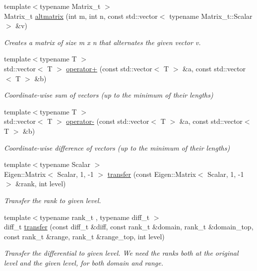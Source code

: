 \begin{DoxyCompactItemize}
{\footnotesize template$<$typename Matrix\+\_\+t $>$ }\\Matrix\+\_\+t \hyperlink{namespaceMackey_a26a529f63caac9c5b4dc809e0e5831be}{altmatrix} (int m, int n, const std\+::vector$<$ typename Matrix\+\_\+t\+::\+Scalar $>$ \&v)
\begin{DoxyCompactList}\small\item\em Creates a matrix of size m x n that alternates the given vector v. \end{DoxyCompactList}\item 
{\footnotesize template$<$typename T $>$ }\\std\+::vector$<$ T $>$ \hyperlink{namespaceMackey_adb4974b5ffe533abb955ccb6b9096155}{operator+} (const std\+::vector$<$ T $>$ \&a, const std\+::vector$<$ T $>$ \&b)
\begin{DoxyCompactList}\small\item\em Coordinate-\/wise sum of vectors (up to the minimum of their lengths) \end{DoxyCompactList}\item 
{\footnotesize template$<$typename T $>$ }\\std\+::vector$<$ T $>$ \hyperlink{namespaceMackey_ae86e49097ef9a09ebcd0173881e88786}{operator-\/} (const std\+::vector$<$ T $>$ \&a, const std\+::vector$<$ T $>$ \&b)
\begin{DoxyCompactList}\small\item\em Coordinate-\/wise difference of vectors (up to the minimum of their lengths) \end{DoxyCompactList}\item 
{\footnotesize template$<$typename Scalar $>$ }\\Eigen\+::\+Matrix$<$ Scalar, 1, -\/1 $>$ \hyperlink{namespaceMackey_a671613d53fc3b0c9c4b115bc8b2797e6}{transfer} (const Eigen\+::\+Matrix$<$ Scalar, 1, -\/1 $>$ \&rank, int level)
\begin{DoxyCompactList}\small\item\em Transfer the rank to given level. \end{DoxyCompactList}\item 
{\footnotesize template$<$typename rank\+\_\+t , typename diff\+\_\+t $>$ }\\diff\+\_\+t \hyperlink{namespaceMackey_ad7524839b58c80d4b2c54827e4833b12}{transfer} (const diff\+\_\+t \&diff, const rank\+\_\+t \&domain, rank\+\_\+t \&domain\+\_\+top, const rank\+\_\+t \&range, rank\+\_\+t \&range\+\_\+top, int level)
\begin{DoxyCompactList}\small\item\em Transfer the differential to given level. We need the ranks both at the original level and the given level, for both domain and range. \end{DoxyCompactList}\item 

\end{DoxyCompactItemize}
